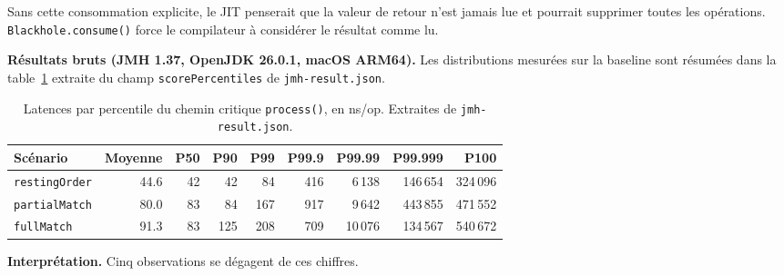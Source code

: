 Sans cette consommation explicite, le JIT penserait que la valeur de retour n'est jamais lue et pourrait supprimer toutes les opérations. \texttt{Blackhole.consume()} force le compilateur à considérer le résultat comme lu. 

\textbf{Résultats bruts (JMH 1.37, OpenJDK 26.0.1, macOS ARM64).} Les distributions mesurées sur la baseline sont résumées dans la table~\ref{tab:jalon0-benchmarks} extraite du champ \texttt{scorePercentiles} de \texttt{jmh-result.json}.

\begin{table}[H]
    \centering
    \begin{tabular}{|l|r|r|r|r|r|r|r|r|}
        \hline
        Scénario & Moyenne & \textbf{P50} & \textbf{P90} & \textbf{P99} & \textbf{P99.9} & \textbf{P99.99} & \textbf{P99.999} & \textbf{P100} \\
        \hline
        \texttt{restingOrder}  & 44.6  & 42 & 42  & 84  & 416  & 6\,138   & 146\,654  & 324\,096 \\
        \texttt{partialMatch}  & 80.0  & 83 & 84  & 167 & 917  & 9\,642   & 443\,855  & 471\,552 \\
        \texttt{fullMatch}     & 91.3  & 83 & 125 & 208 & 709  & 10\,076  & 134\,567  & 540\,672 \\
        \hline
    \end{tabular}
    \caption{Latences par percentile du chemin critique \texttt{process()}, en ns/op. Extraites de \texttt{jmh-result.json}.}
    \label{tab:jalon0-benchmarks}
\end{table}

\textbf{Interprétation.} Cinq observations se dégagent de ces chiffres.

